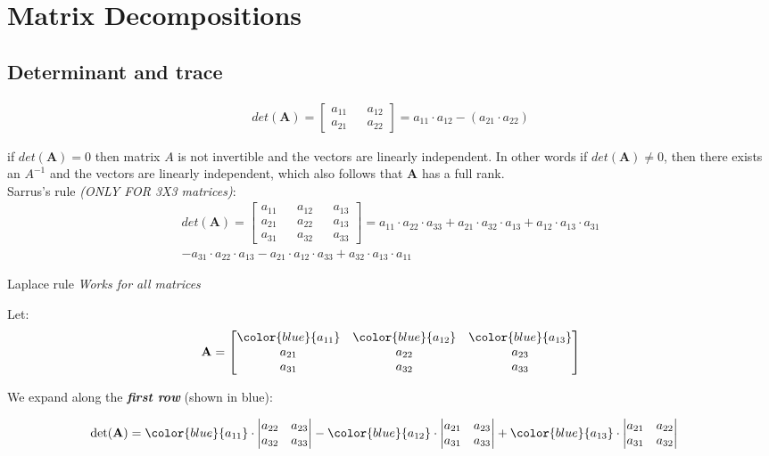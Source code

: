 \section{Matrix Decompositions}
\subsection{Determinant and trace}

\begin{align*}
    det(\textbf{A}) = \begin{bmatrix}
    a_{11} && a_{12} \\
    a_{21} && a_{22}
    \end{bmatrix}
    = a_{11} \cdot a_{12} - (a_{21} \cdot a_{22})
\end{align*}

if $det(\textbf{A}) = 0$ then matrix $A$ is not invertible and the vectors are linearly independent. In other words if $det(\textbf{A}) \neq 0$, then there exists an $A^{-1}$ and the vectors are linearly independent, which also follows that $\textbf{A}$ has a full rank. \\

Sarrus's rule \textit{(ONLY FOR 3X3 matrices)}:
\begin{align*}
    det(\textbf{A}) = \begin{bmatrix}
    a_{11} && a_{12} && a_{13}\\
    a_{21} && a_{22} && a_{13} \\
    a_{31} && a_{32} && a_{33}
    \end{bmatrix}
    = a_{11} \cdot a_{22} \cdot a_{33} + a_{21} \cdot a_{32} \cdot a_{13} + a_{12} \cdot a_{13} \cdot a_{31} \\
    - a_{31} \cdot a_{22} \cdot a_{13} - a_{21} \cdot a_{12} \cdot a_{33} + a_{32} \cdot a_{13} \cdot a_{11}
\end{align*}

Laplace rule \textit{Works for all matrices}

Let:
\[
\textbf{A} = 
\begin{bmatrix}
\color{blue}{a_{11}} & \color{blue}{a_{12}} & \color{blue}{a_{13}} \\
a_{21} & a_{22} & a_{23} \\
a_{31} & a_{32} & a_{33}
\end{bmatrix}
\]

We expand along the \textbf{\textit{first row}} (shown in blue):

\begin{align*}
\det(\textbf{A}) &= 
\color{blue}{a_{11}} \cdot 
\begin{vmatrix}
a_{22} & a_{23} \\
a_{32} & a_{33}
\end{vmatrix}
- \color{blue}{a_{12}} \cdot 
\begin{vmatrix}
a_{21} & a_{23} \\
a_{31} & a_{33}
\end{vmatrix}
+ \color{blue}{a_{13}} \cdot 
\begin{vmatrix}
a_{21} & a_{22} \\
a_{31} & a_{32}
\end{vmatrix}
\end{align*}

